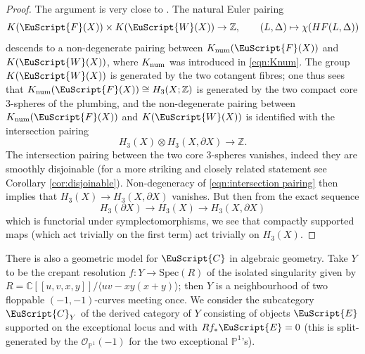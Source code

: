 \documentclass[pdftex]{sigma}
\newcommand{\scrF}{\EuScript{F}}
\newcommand{\scrC}{\EuScript{C}}
\newcommand{\scrE}{\EuScript{E}}
\def\scrW{\EuScript{W}}
\def\bP{\mathbb{P}}
\def\bZ{\mathbb{Z}}
\def\bC{\mathbb{C}}
\theoremstyle{definition}
\numberwithin{equation}{section}
\begin{document}
\begin{proof}
The argument is very close to \cite[Section 3.6]{Keating-Smith}. The natural Euler pairing
\[
K(\scrF(X)) \times K(\scrW(X)) \to \bZ, \qquad (L,\Delta) \mapsto \chi(HF(L,\Delta))
\]
descends to a non-degenerate pairing between $K_{\rm num}(\scrF(X))$ and $K(\scrW(X))$, where $K_{\rm num}$ was introduced in \eqref{eqn:Knum}. The group $K(\scrW(X))$ is generated by the two cotangent fibres; one thus sees that $K_{\rm num}(\scrF(X)) \cong H_3(X;\bZ)$ is generated by the two compact core 3-spheres of the plumbing, and the non-degenerate pairing between $K_{\rm num}(\scrF(X))$ and $K(\scrW(X))$ is identified with the intersection pairing
\begin{equation} \label{eqn:intersection pairing}
H_3(X) \otimes H_3(X,\partial X) \to \bZ.
\end{equation}
The intersection pairing between the two core 3-spheres vanishes, indeed they are smoothly disjoinable (for a more striking and closely related statement see Corollary \ref{cor:disjoinable}). Non-degeneracy of \eqref{eqn:intersection pairing} then implies that $H_3(X) \to H_3(X,\partial X)$ vanishes. But then from the exact sequence
\[
H_3(\partial X) \to H_3(X) \to H_3(X,\partial X)
\]
which is functorial under symplectomorphisms, we see that compactly supported maps (which act trivially on the first term) act trivially on $H_3(X)$.
\end{proof}

There is also a geometric model for $\scrC$ in algebraic geometry. Take
$Y$ to be the crepant resolution $f\colon Y \to \mathrm{Spec}(R)$ of the isolated singularity given by $R = \bC[[u,v,x,y]] / \langle uv-xy(x+y) \rangle$; then $Y$ is a neighbourhood of two floppable $(-1,-1)$-curves meeting once. We consider the subcategory $\scrC_Y$ of the derived category of $Y$ consisting of objects $\scrE$ supported on the exceptional locus and with $Rf_*\scrE = 0$ (this is split-generated by the $\mathcal{O}_{\bP^1}(-1)$ for the two exceptional $\bP^1$'s).
\end{document}
